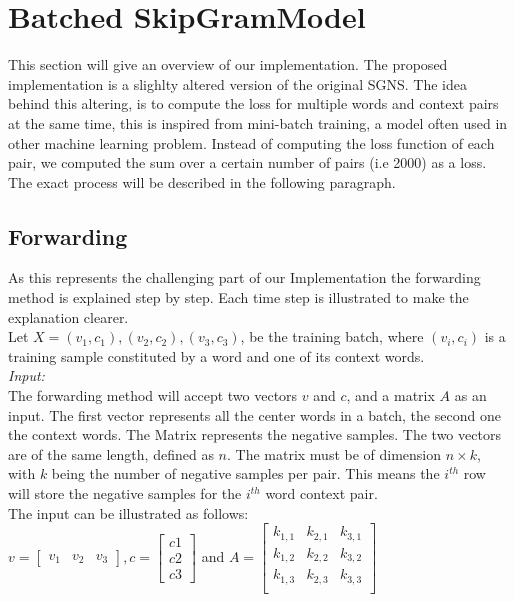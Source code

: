 \section{Batched SkipGramModel} \label{ssec:b_SGM}
This section will give an overview of our implementation. The proposed implementation is a slighlty altered version of the original SGNS. The idea behind this altering, is to compute the loss for multiple words and context pairs at the same time, this is inspired from mini-batch training, a model often used in other machine learning problem. Instead of computing the loss function of each pair, we computed the sum over a certain number of pairs (i.e 2000) as a loss. The exact process will be described in the following paragraph.

\subsection{Forwarding}
As this represents the challenging part of our Implementation the forwarding method is explained step by step. Each time step is illustrated to make the explanation clearer.\\
Let $X = {(v_1,c_1),(v_2,c_2),(v_3,c_3)}$, be the training batch, where $(v_i,c_i)$ is a training sample constituted by a word and one of its context words. \\
\textit{Input:}\\
The forwarding method will accept two vectors $v$ and $c$, and a matrix $A$ as an input. The first vector represents all the center words in a batch, the second one the context words. The Matrix represents the negative samples. The two vectors are of the same length, defined as $n$. The matrix must be of dimension $n \times k$, with $k$ being the number of negative samples per pair. This means the $i^{th}$ row will store the negative samples for the $i^{th}$ word context pair.\\
The input can be illustrated as follows: \\
$v = \begin{bmatrix}
v_1 & v_2 & v_3
\end{bmatrix}, c = \begin{bmatrix}
c1\\
c2\\
c3\end{bmatrix}$ and $A =
\begin{bmatrix}
k_{1,1} & k_{2,1} & k_{3,1}\\
k_{1,2} & k_{2,2} & k_{3,2}\\
k_{1,3} & k_{2,3} & k_{3,3}\\
\end{bmatrix}$\\

